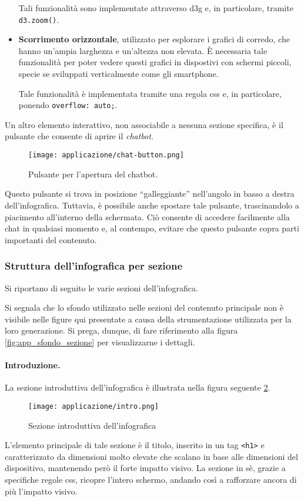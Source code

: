 \begin{itemize}
    Tali funzionalità sono implementate attraverso \gls{d3g} e, in particolare, tramite \texttt{d3.zoom()}.
    \item \textbf{Scorrimento orizzontale}, utilizzato per esplorare i grafici di corredo, che hanno un'ampia larghezza e un'altezza non elevata. È necessaria tale funzionalità per poter vedere questi 
    grafici in dispostivi con schermi piccoli, specie se sviluppati verticalmente come gli smartphone. 
    
    Tale funzionalità è implementata tramite una regola \gls{css} e, in particolare, ponendo \texttt{overflow: auto;}.
\end{itemize}
Un altro elemento interattivo, non associabile a nessuna sezione specifica, è il pulsante che consente di aprire il \emph{chatbot}.
\begin{figure}[H]
    \centering
    \texttt{[image: applicazione/chat-button.png]}
    \caption{Pulsante per l'apertura del chatbot.}
    \label{fig:app_chatbot-button}
\end{figure}
\noindent Questo pulsante si trova in posizione ``galleggiante'' nell'angolo in basso a destra dell'infografica. Tuttavia, è possibile anche spostare tale 
pulsante, trascinandolo a piacimento all'interno della schermata. Ciò consente di accedere facilmente alla chat in qualsiasi momento e, al contempo, evitare che 
questo pulsante copra parti importanti del contenuto.

\subsubsection{Struttura dell'infografica per sezione}
Si riportano di seguito le varie sezioni dell'infografica.

Si segnala che lo sfondo utilizzato nelle sezioni del contenuto principale non è visibile nelle figure qui presentate a causa della strumentazione utilizzata per la loro generazione. 
Si prega, dunque, di fare riferimento alla figura \ref{fig:app_sfondo_sezione} per visualizzarne i dettagli.

\paragraph{Introduzione.} La sezione introduttiva dell'infografica è illustrata nella figura seguente \ref{fig:app_intro}.
\begin{figure}[H] 
    \centering 
    \texttt{[image: applicazione/intro.png]} 
    \caption{Sezione introduttiva dell'infografica}
    \label{fig:app_intro}
\end{figure}
L'elemento principale di tale sezione è il titolo, inserito in un tag \texttt{<h1>} e caratterizzato da dimensioni molto elevate che scalano 
in base alle dimensioni del dispositivo, mantenendo però il forte impatto visivo.
La sezione in sè, grazie a specifiche regole \gls{css}, ricopre l'intero schermo, andando così a rafforzare ancora di più l'impatto visivo. 

